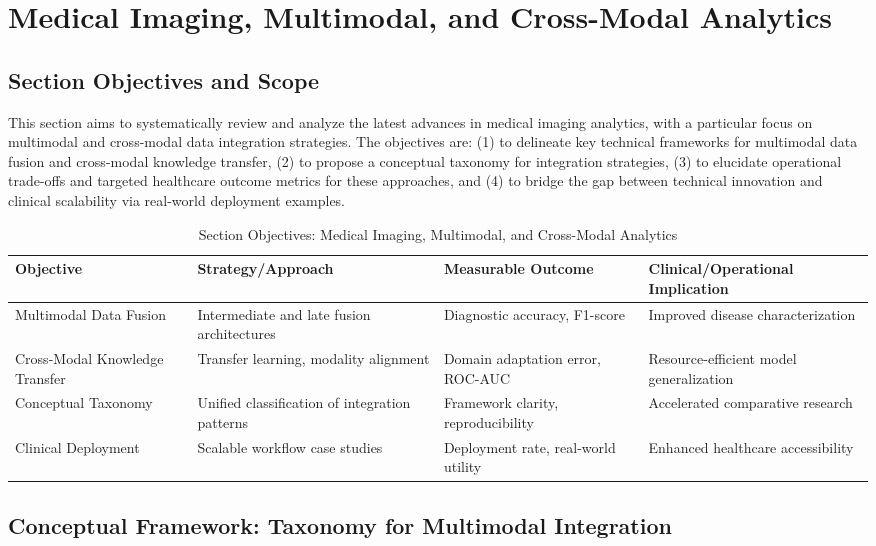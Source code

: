 \documentclass[sigconf]{acmart}
\begin{document}
\section{Medical Imaging, Multimodal, and Cross-Modal Analytics}

\subsection*{Section Objectives and Scope}
This section aims to systematically review and analyze the latest advances in medical imaging analytics, with a particular focus on multimodal and cross-modal data integration strategies. The objectives are: (1) to delineate key technical frameworks for multimodal data fusion and cross-modal knowledge transfer, (2) to propose a conceptual taxonomy for integration strategies, (3) to elucidate operational trade-offs and targeted healthcare outcome metrics for these approaches, and (4) to bridge the gap between technical innovation and clinical scalability via real-world deployment examples.

\begin{table*}[htbp]
\centering
\caption{Section Objectives: Medical Imaging, Multimodal, and Cross-Modal Analytics}
\label{tab:section-objectives-medical}
\begin{adjustbox}{max width=\textwidth}
\begin{tabular}{@{}llll@{}}
\toprule
Objective & Strategy/Approach & Measurable Outcome & Clinical/Operational Implication \\
\midrule
Multimodal Data Fusion & Intermediate and late fusion architectures & Diagnostic accuracy, F1-score & Improved disease characterization \\
Cross-Modal Knowledge Transfer & Transfer learning, modality alignment & Domain adaptation error, ROC-AUC & Resource-efficient model generalization \\
Conceptual Taxonomy & Unified classification of integration patterns & Framework clarity, reproducibility & Accelerated comparative research \\
Clinical Deployment & Scalable workflow case studies & Deployment rate, real-world utility & Enhanced healthcare accessibility \\
\bottomrule
\end{tabular}
\end{adjustbox}
\end{table*}

\subsection*{Conceptual Framework: Taxonomy for Multimodal Integration}
\end{document}
